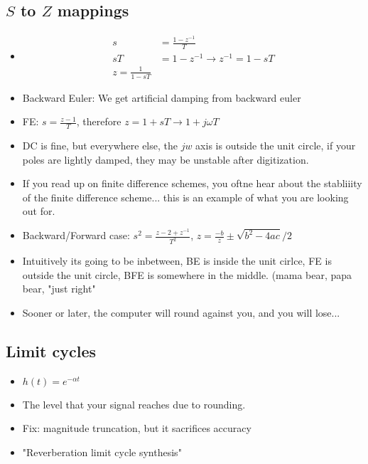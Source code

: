 \subsection*{$S$ to $Z$ mappings}
\begin{itemize}
\item{
\begin{align*}
s &= \frac{1 - z^{-1}}{T}\\
sT &= 1 - z^{-1} \rightarrow z^{-1} = 1 - sT\\
z = \frac{1}{1 - sT}
\end{align*}
}
\item{
Backward Euler: We get artificial damping from backward euler
}
\item{
FE: $s = \frac{z - 1}{T}$, therefore $z = 1 + sT \rightarrow 1 + j\omega T$
} \item{
DC is fine, but everywhere else, the $jw$ axis is outside the unit circle, 
if your poles are lightly damped, they may be unstable after digitization.
}
\item{
If you read up on finite difference schemes, you oftne hear about the stabliiity of the finite
difference scheme... this is an example of what you are looking out for. 
}
\item{
Backward/Forward case: $s^2 = \frac{z - 2 + z^{-1}}{T^2} $,
$z = \frac{-b}{z} \pm \sqrt{b^2 - 4ac} / 2$
}
\item{
Intuitively its going to be inbetween, BE is inside the unit cirlce, FE is outside the unit circle, 
BFE is somewhere in the middle. (mama bear, papa bear, "just right"
}
\item{
Sooner or later, the computer will round against you, and you will lose...
}
\end{itemize}

\subsection*{Limit cycles}
\begin{itemize}
\item{
$h(t) = e^{-\alpha t}
$
}
\item{
The level that your signal reaches due to rounding.
}
\item{
Fix: magnitude truncation, but it sacrifices accuracy
}
\item{
"Reverberation limit cycle synthesis"
}
\end{itemize}



